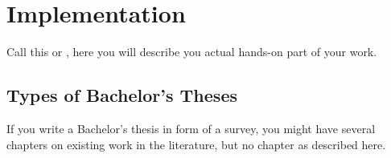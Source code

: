 
\chapter{Implementation} \label{chapter:implementation}

Call this  or , here you will
describe you actual hands-on part of your work.

\section{Types of Bachelor's Theses}

If you write a Bachelor's thesis in form of a survey, you might have
several chapters on existing work in the literature, but no chapter
as described here.



